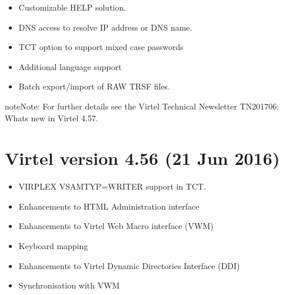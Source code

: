 \documentclass[letterpaper,10pt,english]{sphinxmanual}
\begin{document}
\sphinxAtStartPar
{}
\begin{itemize}
\item {} 
\sphinxAtStartPar
Customizable HELP solution.

\item {} 
\sphinxAtStartPar
DNS access to resolve IP address or DNS name.

\item {} 
\sphinxAtStartPar
TCT option to support mixed case passwords

\item {} 
\sphinxAtStartPar
Additional language support

\item {} 
\sphinxAtStartPar
Batch export/import of RAW TRSF files.

\end{itemize}

\begin{sphinxadmonition}{note}{Note:}
\sphinxAtStartPar
For further details see the Virtel Technical Newsletter TN201706: Whats new in Virtel 4.57.
\end{sphinxadmonition}


\section{Virtel version 4.56 (21 Jun 2016)}
\label{\detokenize{Installation_Guide:virtel-version-4-56-21-jun-2016}}
\sphinxAtStartPar
{}
\begin{itemize}
\item {} 
\sphinxAtStartPar
VIRPLEX VSAMTYP=WRITER support in TCT.

\item {} 
\sphinxAtStartPar
Enhancements to HTML Administration interface

\item {} 
\sphinxAtStartPar
Enhancements to Virtel Web Macro interface (VWM)

\item {} 
\sphinxAtStartPar
Keyboard mapping

\item {} 
\sphinxAtStartPar
Enhancements to Virtel Dynamic Directories Interface (DDI)

\item {} 
\sphinxAtStartPar
Synchronisation with VWM

\end{itemize}
\end{document}
